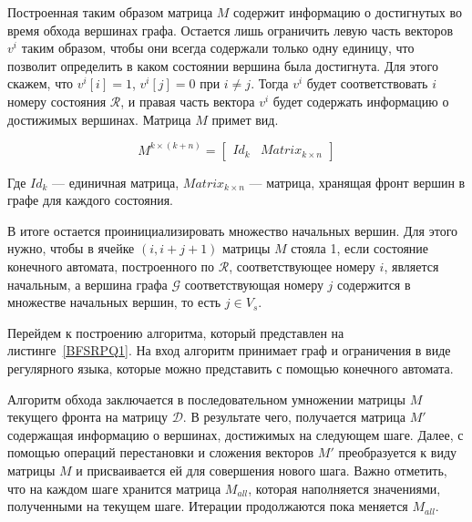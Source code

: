 Построенная таким образом матрица $M$ содержит информацию о достигнутых во время обхода вершинах графа. Остается лишь ограничить левую часть векторов $v^i$ таким образом, чтобы они всегда содержали только одну единицу, что позволит определить в каком состоянии вершина была достигнута. Для этого скажем, что $v^i[i] = 1$, $v^i[j] = 0$ при $i \neq j$. Тогда $v^i$ будет соответствовать $i$ номеру состояния $\mathcal{R}$, и правая часть вектора $v^i$ будет содержать информацию о достижимых вершинах. Матрица $M$ примет вид.

\begin{equation}
  M^{k \times (k + n)} =
  \left[
    \begin{matrix}
      Id_k & Matrix_{k \times n }
    \end{matrix}
    \right]
\end{equation}

Где $Id_k$ --- единичная матрица, $Matrix_{k \times n }$ --- матрица, хранящая фронт вершин в графе для каждого состояния.

В итоге остается проинициализировать множество начальных вершин. Для этого нужно, чтобы в ячейке $(i, i+j+1)$ матрицы $M$ стояла 1, если состояние конечного автомата, построенного по $\mathcal{R}$, соответствующее номеру $i$, является начальным, а вершина графа $\mathcal{G}$ соответствующая номеру $j$ содержится в множестве начальных вершин, то есть $j \in V_{s}$.

Перейдем к построению алгоритма, который представлен на листинге~\ref{BFSRPQ1}. На вход алгоритм принимает граф и ограничения в виде регулярного языка, которые можно представить с помощью конечного автомата.

Алгоритм обхода заключается в последовательном умножении матрицы $M$ текущего фронта на матрицу $\mathcal{D}$. В результате чего, получается матрица $M'$ содержащая информацию о вершинах, достижимых на следующем шаге. Далее, с помощью операций перестановки и сложения векторов $M'$ преобразуется к виду матрицы $M$ и присваивается ей для совершения нового шага.
Важно отметить, что на каждом шаге хранится матрица $M_{all}$, которая наполняется значениями, полученными на текущем шаге. Итерации продолжаются пока меняется $M_{all}$.

